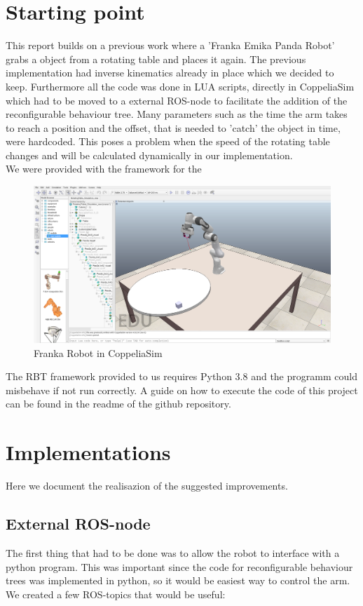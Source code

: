 \documentclass[report]{iisthesis}
\begin{document}
\setcounter{chapter}{1}
\setcounter{section}{0}
\chapter{Starting point}
This report builds on a previous work where a 'Franka Emika Panda Robot' grabs a object from a rotating table and places it again.
The previous implementation had inverse kinematics already in place which we decided to keep. Furthermore all the code was done in LUA scripts, directly in CoppeliaSim which had to be moved to a external ROS-node to facilitate the addition of the reconfigurable behaviour tree.
Many parameters such as the time the arm takes to reach a position and the offset, that is needed to 'catch' the object in time, were hardcoded. This poses a problem when the speed of the rotating table changes and will be calculated dynamically in our implementation.\\
We were provided with the framework for the 

\begin{figure}[h]
    \caption{Franka Robot in CoppeliaSim}
    \includegraphics[width=\textwidth]{arm_coppeliaSim}
\end{figure}
\noindent
The RBT framework provided to us requires Python 3.8 and the programm could misbehave if not run correctly.
A guide on how to execute the code of this project can be found in the readme of the github repository. 

\setcounter{chapter}{2}
\setcounter{section}{0}
\chapter{Implementations}
Here we document the realisazion of the suggested improvements.

\section{External ROS-node}
The first thing that had to be done was to allow the robot to interface with a python program.
This was important since the code for reconfigurable behaviour trees was implemented in python, so it would be easiest way to control the 
arm.
We created a few ROS-topics that would be useful:
\end{document}
